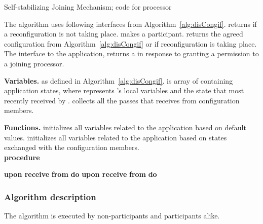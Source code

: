 \documentclass[11pt]{article}
\begin{document}
\setlength{\intextsep}{0pt}
\begin{algorithm}[t]

\caption{Self-stabilizing Joining Mechanism; code for processor }
\label{alg:join} \begin{footnotesize}

The algorithm uses following interfaces from Algorithm~\ref{alg:disCongif}.
 returns  if a reconfiguration is not taking place.
 makes  a participant. 
 returns the agreed configuration from Algorithm~\ref{alg:disCongif} or  if reconfiguration is taking place.
The  interface to the application, returns a  in response to granting a permission to a joining processor.


{\bf Variables.}
 as defined in Algorithm~\ref{alg:disCongif}.
 is array of containing application states, where  represents 's local variables and  the state that  most recently received by .  collects all the passes that  receives from configuration members.

{\bf Functions.}  initializes all variables related to the application based on default values.
 initializes all variables related to the application based on states exchanged with the configuration members.\\ 



{\bf procedure}  


{\bf upon receive}  \textbf{from}  {\bf do} 
{\bf upon receive}  \textbf{from}  {\bf do} \Begin{
\lIf{}{
} \label{JOIN:receiveJoiner} 
}

\end{footnotesize}
\end{algorithm}





\subsubsection{Algorithm description}
The algorithm is executed by non-participants and participants alike.
\end{document}
